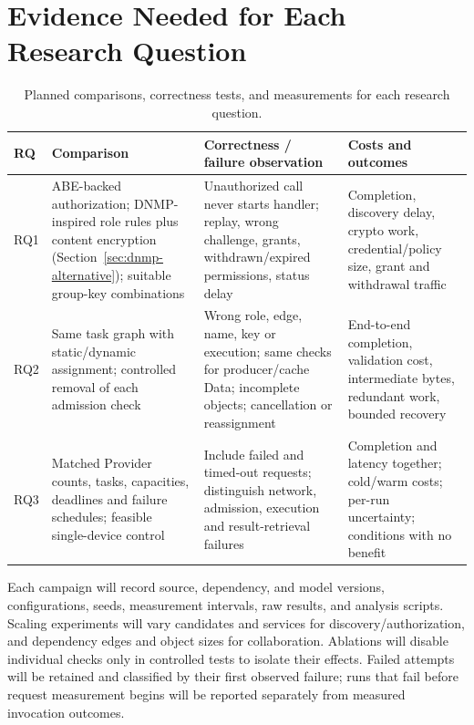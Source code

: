 \section{Evidence Needed for Each Research Question}
\begin{table}[H]
\singlespacing
\centering\small
\caption{Planned comparisons, correctness tests, and measurements for each research question.}
\begin{tabularx}{\textwidth}{p{}XXX}
\toprule
RQ & Comparison & Correctness / failure observation & Costs and outcomes\\\midrule
RQ1 & ABE-backed authorization; DNMP-inspired role rules plus content encryption (Section~\ref{sec:dnmp-alternative}); suitable group-key combinations & Unauthorized call never starts handler; replay, wrong challenge, grants, withdrawn/expired permissions, status delay & Completion, discovery delay, crypto work, credential/policy size, grant and withdrawal traffic\\\midrule
RQ2 & Same task graph with static/dynamic assignment; controlled removal of each admission check & Wrong role, edge, name, key or execution; same checks for producer/cache Data; incomplete objects; cancellation or reassignment & End-to-end completion, validation cost, intermediate bytes, redundant work, bounded recovery\\\midrule
RQ3 & Matched Provider counts, tasks, capacities, deadlines and failure schedules; feasible single-device control & Include failed and timed-out requests; distinguish network, admission, execution and result-retrieval failures & Completion and latency together; cold/warm costs; per-run uncertainty; conditions with no benefit\\\bottomrule
\end{tabularx}
\end{table}

Each campaign will record source, dependency, and model versions, configurations, seeds, measurement intervals, raw results, and analysis scripts. Scaling experiments will vary candidates and services for discovery/authorization, and dependency edges and object sizes for collaboration. Ablations will disable individual checks only in controlled tests to isolate their effects. Failed attempts will be retained and classified by their first observed failure; runs that fail before request measurement begins will be reported separately from measured invocation outcomes.



